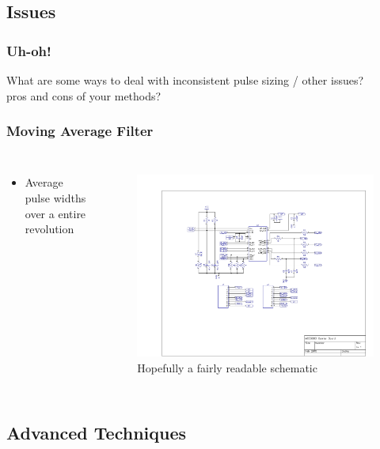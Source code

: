 \documentclass{beamer}
\begin{document}
\subsection{Issues}

\begin{frame}
\frametitle{Uh-oh!}
\centering
What are some ways to deal with inconsistent pulse sizing / other issues? \\
{\tiny pros and cons of your methods?}
\end{frame}

\begin{frame}
\frametitle{Moving Average Filter}
\begin{columns}[t]
\begin{itemize}
  \item Average pulse widths over a entire revolution
\end{itemize}

\begin{figure}
  \centering
  \includegraphics[width=1.0\columnwidth]{images-dis5/mc33883-schematic} \\
  Hopefully a fairly readable schematic
\end{figure}
\end{columns}
\end{frame}

\subsection{Advanced Techniques}
\end{document}
